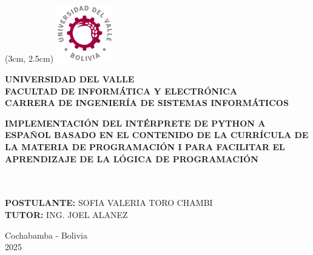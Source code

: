 \documentclass[letterpaper,11pt]{article}
\begin{document}
\begin{center}
    \vspace*{0.6cm}
    \begin{textblock*}{2.5cm}(3cm, 2.5cm) %
        \includegraphics[width=2.5cm]{images/univalle.png}
    \end{textblock*}

    \textbf{\LARGE UNIVERSIDAD DEL VALLE}\\[0.2cm]
    \textbf{\large FACULTAD DE INFORMÁTICA Y ELECTRÓNICA}\\[0.2cm]
    \textbf{\large CARRERA DE INGENIERÍA DE SISTEMAS INFORMÁTICOS}\\[4cm]

    \begin{minipage}{1\textwidth}
        \centering
        \singlespacing
        \Large
        \textbf{IMPLEMENTACIÓN DEL INTÉRPRETE DE PYTHON A ESPAÑOL BASADO EN EL CONTENIDO DE LA CURRÍCULA DE LA MATERIA DE PROGRAMACIÓN I PARA FACILITAR EL APRENDIZAJE DE LA LÓGICA DE PROGRAMACIÓN}
    \end{minipage}\\[5cm]


    \noindent{}\\[2cm]

    \textbf{POSTULANTE:} SOFIA VALERIA TORO CHAMBI\\[0.15cm]
    \textbf{TUTOR:} ING. JOEL ALANEZ\\[2cm]

    \vfill

    \begin{minipage}{0.5\textwidth}
        \centering
        \onehalfspacing
        Cochabamba - Bolivia\\
        2025
    \end{minipage}

\end{center}
\end{document}
